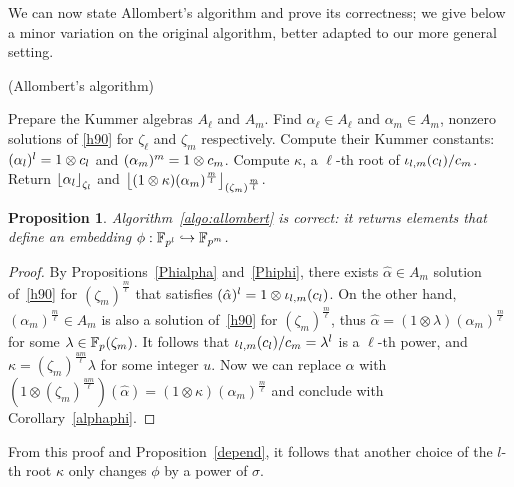 \documentclass[sigconf]{acmart}
\newtheorem{proposition}[theorem]{Proposition}
\begin{document}
We can now state Allombert's algorithm and prove its correctness; we
give below a minor variation on the original algorithm, better adapted
to our more general setting.
\begin{algorithm}
  \caption{(Allombert's algorithm)}
  \label{algo:allombert}
  \begin{algorithmic}[1]
  \STATE Prepare the Kummer algebras $A_\ell$ and $A_m$.
  \STATE Find $\alpha_\ell\in A_\ell$ and $\alpha_m\in A_m$, nonzero solutions of \eqref{h90} for $\zeta_\ell$
  and $\zeta_m$ respectively.
  \STATE Compute their Kummer constants: $(\alpha_l)^l=1\otimes c_l$ and
  $(\alpha_m)^m=1\otimes c_m$.
  \STATE Compute $\kappa$, a $\ell$-th root of ${\iota_{{l},{m}}}(c_l)/c_m$.
  \STATE Return $\left\lfloor \alpha_{l} \right\rfloor_{\zeta_l}$ and $\left\lfloor (1\otimes\kappa)(\alpha_m)^{\frac{m}{l}} \right\rfloor_{(\zeta_m)^{\frac{m}{l}}}$.
  \end{algorithmic}
\end{algorithm}
\begin{proposition}
  Algorithm~\ref{algo:allombert} is correct: it returns elements that define an
  embedding $\phi:\mathbb{F}_{p^l}\hookrightarrow\mathbb{F}_{p^m}$.
\end{proposition}
\begin{proof}
By Propositions~\ref{Phialpha} and~\ref{Phiphi}, there exists $\hat{\alpha}\in A_m$
solution of~\eqref{h90} for $(\zeta_m)^{\frac{m}{\ell}}$ that satisfies $(\hat{\alpha})^l=1\otimes{\iota_{{l},{m}}}(c_l)$.
On the other hand, $(\alpha_m)^{\frac{m}{\ell}}\in A_m$ is also a solution of~\eqref{h90} for $(\zeta_m)^{\frac{m}{\ell}}$,
thus $\hat{\alpha}=(1\otimes\lambda)(\alpha_m)^{\frac{m}{\ell}}$ for some $\lambda\in\mathbb{F}_{p}(\zeta_m)$.
It follows that ${\iota_{{l},{m}}}(c_l)/c_m=\lambda^l$ is a $\ell$-th power,
and $\kappa = (\zeta_{m})^{\frac{um}{\ell}}\lambda$ for some integer $u$.
Now we can replace $\hat{\alpha}$
with $(1\otimes(\zeta_{m})^{\frac{um}{\ell}})(\hat{\alpha})=(1\otimes\kappa)(\alpha_m)^{\frac{m}{\ell}}$
and conclude with Corollary~\ref{alphaphi}.
\end{proof}
From this proof and Proposition~\ref{depend}, it follows that another choice of the $l$-th root $\kappa$
only changes $\phi$ by a power of $\sigma$.
    
\end{document}
